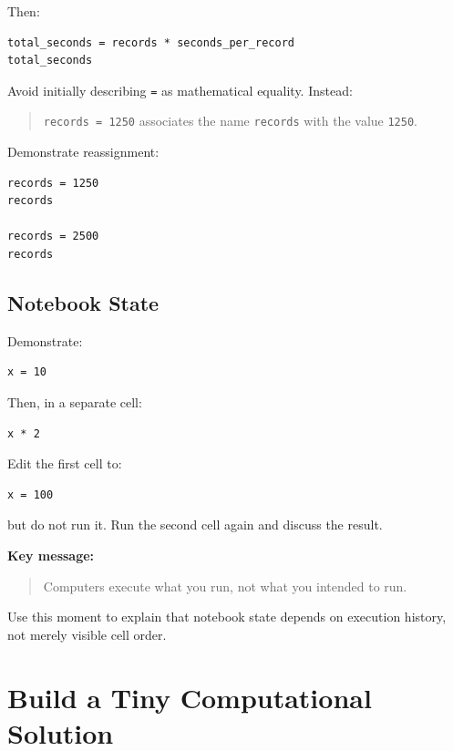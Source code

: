 \documentclass[11pt]{article}
\begin{document}
Then:

\begin{lstlisting}
total_seconds = records * seconds_per_record
total_seconds
\end{lstlisting}

Avoid initially describing \texttt{=} as mathematical equality. Instead:

\begin{quote}
\texttt{records = 1250} associates the name \texttt{records} with the value \texttt{1250}.
\end{quote}

Demonstrate reassignment:

\begin{lstlisting}
records = 1250
records

records = 2500
records
\end{lstlisting}

\subsection*{Notebook State}

Demonstrate:

\begin{lstlisting}
x = 10
\end{lstlisting}

Then, in a separate cell:

\begin{lstlisting}
x * 2
\end{lstlisting}

Edit the first cell to:

\begin{lstlisting}
x = 100
\end{lstlisting}

but do not run it. Run the second cell again and discuss the result.

\textbf{Key message:}

\begin{quote}
Computers execute what you run, not what you intended to run.
\end{quote}

Use this moment to explain that notebook state depends on execution history, not merely visible cell order.

\section{Build a Tiny Computational Solution}
\end{document}
